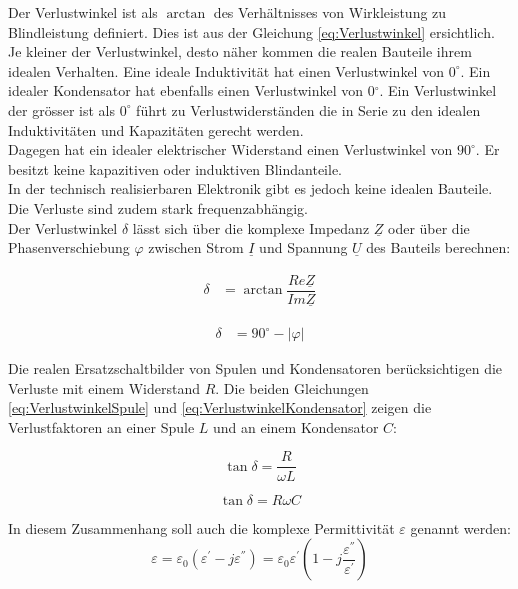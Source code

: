 Der Verlustwinkel ist als $\arctan$ des Verhältnisses von Wirkleistung zu Blindleistung definiert. Dies ist  aus der Gleichung  \ref{eq:Verlustwinkel} ersichtlich. 
Je kleiner der Verlustwinkel, desto näher kommen die realen Bauteile ihrem idealen Verhalten. Eine ideale Induktivität hat einen Verlustwinkel von $0^\circ$. Ein idealer Kondensator hat ebenfalls einen Verlustwinkel von 0$^\circ$. Ein Verlustwinkel der grösser ist als $0^\circ$ führt zu Verlustwiderständen die in Serie zu den idealen Induktivitäten und Kapazitäten gerecht werden.\\
Dagegen hat ein idealer elektrischer Widerstand  einen Verlustwinkel von $90^\circ$. Er besitzt keine kapazitiven oder induktiven Blindanteile.\\
In der technisch realisierbaren Elektronik gibt es jedoch keine idealen Bauteile. Die Verluste sind zudem stark frequenzabhängig.\\
Der Verlustwinkel  $\delta$  lässt sich über die komplexe Impedanz $\underline{Z}$ oder über die Phasenverschiebung  $\varphi$  zwischen Strom $\underline{I}$ und Spannung $\underline{U}$ des Bauteils berechnen: 


\label{eq:Verlustwinkel}
\begin{align}
\delta &= \arctan \dfrac{Re\underline{Z}}{Im\underline{Z}}
\end{align}

\label{eq:Verlustwinkel_aus_Phi}
\begin{align}
\delta &= 90^\circ - |\varphi|
\end{align}

Die realen Ersatzschaltbilder von Spulen und Kondensatoren berücksichtigen die Verluste mit einem Widerstand $R$.
Die beiden Gleichungen \ref{eq:VerlustwinkelSpule} und \ref{eq:VerlustwinkelKondensator} zeigen die Verlustfaktoren an einer Spule $L$ und an einem Kondensator $C$:

\begin{equation}\label{eq:VerlustwinkelSpule}
\tan \delta = \dfrac{R}{\omega L}
\end{equation}

\begin{equation} \label{eq:VerlustwinkelKondensator}
\tan \delta = R \omega C
\end{equation}

In diesem Zusammenhang soll auch die komplexe Permittivität $\varepsilon$ genannt werden:
\begin{equation} \label{eq:komplexePermitivität}
\varepsilon=\varepsilon_0(\varepsilon^{'}-j\varepsilon^{''})=\varepsilon_0\varepsilon^{'}(1-j\dfrac{\varepsilon^{''}}{\varepsilon^{'}})
\end{equation}

